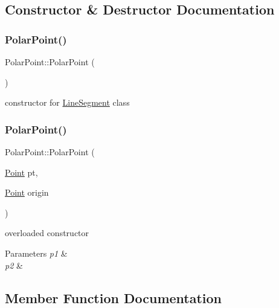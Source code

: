 \subsection{Constructor \& Destructor Documentation}
\mbox{\label{class_polar_point_aa5dc669fa33f48c9dccd235751cb8db5}} 
\subsubsection{\texorpdfstring{PolarPoint()}{PolarPoint()}\hspace{0.1cm}{\footnotesize\ttfamily [1/2]}}
{\footnotesize\ttfamily Polar\+Point\+::\+Polar\+Point (\begin{DoxyParamCaption}{ }\end{DoxyParamCaption})}

constructor for \mbox{\hyperlink{class_line_segment}{Line\+Segment}} class \mbox{\label{class_polar_point_a85656b69c29c9f60781dd734926863b6}} 
\subsubsection{\texorpdfstring{PolarPoint()}{PolarPoint()}\hspace{0.1cm}{\footnotesize\ttfamily [2/2]}}
{\footnotesize\ttfamily Polar\+Point\+::\+Polar\+Point (\begin{DoxyParamCaption}\item[{\mbox{\hyperlink{class_point}{Point}}}]{pt,  }\item[{\mbox{\hyperlink{class_point}{Point}}}]{origin }\end{DoxyParamCaption})}

overloaded constructor 
\begin{DoxyParams}{Parameters}
{\em p1} & \\
\hline
{\em p2} & \\
\hline
\end{DoxyParams}


\subsection{Member Function Documentation}
\mbox{\label{class_polar_point_a5918f355697069f0e54e924673c7a872}} 
